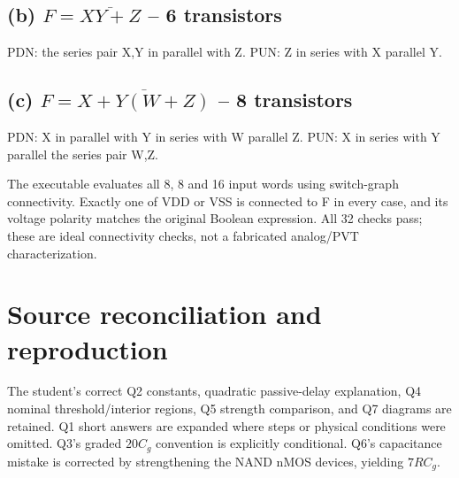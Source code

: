 \documentclass[10pt]{article}
\newcommand{\mos}[4]{\begin{scope}[shift={(#1,#2)}]
\draw (0,.24)--(0,-.24);\draw (0,.20)--(.25,.20)--(.25,.5);
\draw (0,-.20)--(.25,-.20)--(.25,-.5);\draw (-.16,.23)--(-.16,-.23);
\ifnum#4=1\draw (-.26,0) circle (.06);\draw (-.75,0)--(-.32,0);\else\draw (-.75,0)--(-.16,0);\fi
\node[anchor=east,font=\scriptsize] at (-.76,0) {$#3$};\end{scope}}
\newcommand{\ground}[2]{\draw (#1,#2)--(#1,{#2-.12});\draw ({#1-.17},{#2-.12})--({#1+.17},{#2-.12});\draw ({#1-.11},{#2-.20})--({#1+.11},{#2-.20});}
\newcommand{\rail}[3]{\draw (#1,#2)--(#1,{#2+.14});\node[above,font=\scriptsize] at (#1,{#2+.14}) {$#3$};}
\begin{document}
\subsection*{(b) $F=\overline{XY+Z}$ -- 6 transistors}
PDN: the series pair X,Y in parallel with Z. PUN: Z in series with X parallel Y.
\begin{center}\end{center}
\newpage\subsection*{(c) $F=\overline{X+Y(W+Z)}$ -- 8 transistors}
PDN: X in parallel with Y in series with W parallel Z. PUN: X in series with Y parallel the series pair W,Z.
\begin{center}\end{center}
The executable evaluates all 8, 8 and 16 input words using switch-graph connectivity. Exactly one of VDD or VSS is connected to F in every case, and its voltage polarity matches the original Boolean expression. All 32 checks pass; these are ideal connectivity checks, not a fabricated analog/PVT characterization.

\section*{Source reconciliation and reproduction}
The student's correct Q2 constants, quadratic passive-delay explanation, Q4 nominal threshold/interior regions, Q5 strength comparison, and Q7 diagrams are retained. Q1 short answers are expanded where steps or physical conditions were omitted. Q3's graded $20C_g$ convention is explicitly conditional. Q6's capacitance mistake is corrected by strengthening the NAND nMOS devices, yielding $7RC_g$.
\end{document}
